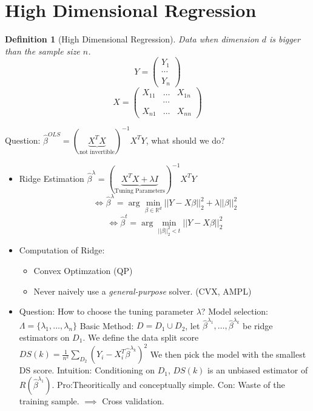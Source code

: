 \documentclass{article}
\newtheorem{definition}{Definition}
\begin{document}
\section{High Dimensional Regression}
\begin{definition}[High Dimensional Regression]
  Data when dimension $d$ is bigger than the sample size $n$.
  \[
    Y = \left(
      \begin{array}{c}
        Y_1\\\cdots\\Y_n
      \end{array}
    \right)
  \]
  \[
    X = \left(
      \begin{array}{ccc}
        X_{11}&\ldots&X_{1n}\\&\cdots\\X_{n1}&\ldots&X_{nn}
      \end{array}
    \right)
  \]
\end{definition}
Question: $\hat \beta^{OLS} = (\underbrace{X^TX}_{\text{not invertible}})^{-1}X^TY$, what should we do?
\begin{itemize}
\item Ridge Estimation $\hat \beta^{\lambda} =  (\underbrace{X^TX + \lambda I}_{\text{Tuning Parameters}})^{-1}X^TY$
  $$\iff \hat \beta^{\lambda} = \arg\min_{\beta \in \mathbb R^d} ||Y - X\beta||_2^2 + \lambda ||\beta||_2^2$$
  $$\iff \hat \beta^{t} = \arg\min_{||\beta||_2^2 < t} ||Y - X\beta||_2^2$$
  
\item Computation of Ridge:
  \begin{itemize}
  \item Convex Optimzation (QP)
  \item Never naively use a \textit{general-purpose} solver. (CVX, AMPL)
  \end{itemize}
\item Question: How to choose the tuning parameter $\lambda$?
  Model selection: $\Lambda = \{ \lambda_1, \ldots, \lambda_n \}$
  Basic Method: $D = D_1 \cup D_2$, let $\hat \beta^{\lambda_1}, \ldots, \hat \beta^{\lambda_k}$ be ridge estimators on $D_1$.
  We define the data split score $DS(k) = \frac1{n^2} \sum_{D_2} (Y_i - X_i^T \hat \beta^{\lambda_k})^2$
  We then pick the model with the smallest DS score.
  Intuition: Conditioning on $D_1$, $DS(k)$ is an unbiased estimator of $R(\hat \beta^{\lambda_1})$.
  Pro:Theoritically and conceptually simple.
  Con: Waste of the training sample. $\implies$ Cross validation.
\end{itemize}
\end{document}
